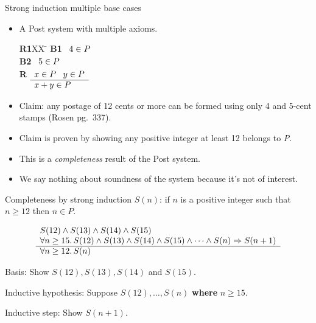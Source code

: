 \documentclass[style=sailor,size=12pt]{powerdot}
\begin{document}
\begin{wideslide}[bm=,toc=]{Strong induction multiple base cases}
\begin{itemize}
\item A Post system with multiple axioms.
\vspace{-1em}
\begin{tabbing}
{\bf R1}XX \=  \kill
{\bf B1} \>
        \(\begin{array}[t]{l}
        4\in P
        \end{array}\) \\[2ex]
{\bf B2} \>
        \(\begin{array}[t]{l}
        5\in P
        \end{array}\) \\[2ex]
        
{\bf R} \>
        \(\begin{array}[t]{l}
        x \in P \;\;\;y \in P \\
        \hline
        x + y \in P
        \end{array}\)
\end{tabbing}
\item Claim: any postage of 12 cents or more can be formed using only 4 and 5-cent stamps (Rosen pg.\ 337).
\item Claim is proven by showing any positive integer at least 12 belongs to {\em P\/}.
\item This is a {\em completeness\/} result of the Post system.
\item We say nothing about soundness of the system because it's not of interest. 
\end{itemize}
\end{wideslide}

\begin{wideslide}[bm=,toc=]{Completeness by strong induction}
$S(n)$: if $n$ is a positive integer such that $n\geq 12$ then $n\in P$.

\begin{displaymath}
\begin{array}[t]{l}
S(12) \wedge S(13) \wedge S(14) \wedge S(15) \\
\forall n\geq 15.\, S(12)\wedge S(13)\wedge S(14)\wedge S(15)\wedge\cdots\wedge S(n)\Rightarrow S(n+1) \\
\hline
\forall n\geq 12.\, S(n)
\end{array}
\end{displaymath}

\vspace{1em}
Basis: Show $S(12),S(13),S(14)$ and $S(15)$.

\vspace{1em}
Inductive hypothesis: Suppose $S(12), \ldots , S(n)$ {\bf where} $n\geq 15$.

\vspace{1em}
Inductive step: Show $S(n+1)$.
\end{wideslide}
\end{document}
